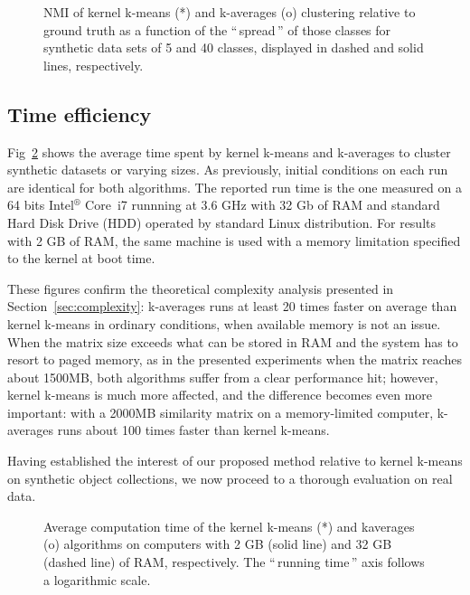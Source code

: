 \documentclass[10pt,letterpaper]{article}
\newcommand{\gl}[1]{``\,#1\,''} %
\begin{document}
\begin{figure}[h]
\center
\caption{NMI of kernel k-means (*) and k-averages (o) clustering relative to ground truth as a function of the \gl{spread} of those classes for synthetic data sets of 5 and 40 classes, displayed in dashed and solid lines, respectively.}
\label{fig:synth_perf}
\end{figure}


\subsection{Time efficiency}

Fig~\ref{fig:timing} shows the average time spent by kernel k-means and k-averages to cluster synthetic datasets or varying sizes. As previously, initial conditions on each run are identical for both algorithms. The reported run time is the one measured on a 64 bits Intel$^\circledR$ Core\texttrademark   \, i7 runnning at 3.6 GHz with 32 Gb of RAM and standard Hard Disk Drive (HDD)  operated by standard Linux distribution. For results with 2 GB of RAM, the same machine is used with a memory limitation specified to the kernel at boot time.


These figures confirm the theoretical complexity analysis presented in Section~\ref{sec:complexity}: k-averages runs at least 20 times faster on average than kernel k-means in ordinary conditions, when  available memory is not an issue. When the matrix size exceeds what can be stored in RAM and the system has to resort to paged memory, as in the presented experiments when the matrix reaches about 1500MB, both algorithms suffer from a clear performance hit; however, kernel k-means is much more affected, and the difference becomes even more important: with a 2000MB similarity matrix on a memory-limited computer, k-averages runs about 100 times faster than kernel k-means.

Having established the interest of our proposed method relative to kernel k-means on synthetic object collections, we now proceed to a thorough evaluation on real data.

\begin{figure}[h]
\center
\caption{Average computation time of the kernel k-means (*) and kaverages (o) algorithms on computers with 2 GB (solid line) and 32 GB (dashed line) of RAM, respectively. The \gl{running time} axis follows a logarithmic scale.}
\label{fig:timing}
\end{figure}
\end{document}
